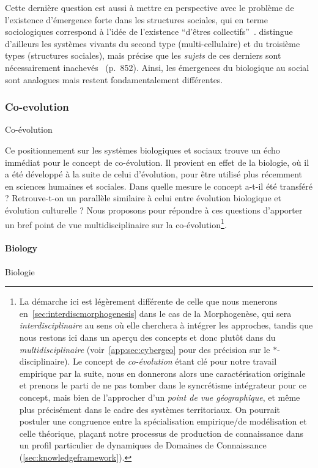 Cette dernière question est aussi à mettre en perspective avec le problème de l'existence d'émergence forte dans les structures sociales, qui en terme sociologiques correspond à l'idée de l'existence ``d'êtres collectifs''~\cite{angeletti2015etres}.  distingue d'ailleurs les systèmes vivants du second type (multi-cellulaire) et du troisième types (structures sociales), mais précise que les \emph{sujets} de ces derniers sont nécessairement inachevés~\cite{morin1980methode} (p.~852). Ainsi, les émergences du biologique au social sont analogues mais restent fondamentalement différentes.



\subsubsection{Co-evolution}{Co-évolution}


Ce positionnement sur les systèmes biologiques et sociaux trouve un écho immédiat pour le concept de co-évolution. Il provient en effet de la biologie, où il a été développé à la suite de celui d'évolution, pour être utilisé plus récemment en sciences humaines et sociales. Dans quelle mesure le concept a-t-il été transféré ? Retrouve-t-on un parallèle similaire à celui entre évolution biologique et évolution culturelle ? Nous proposons pour répondre à ces questions d'apporter un bref point de vue multidisciplinaire sur la co-évolution\footnote{La démarche ici est légèrement différente de celle que nous menerons en~\ref{sec:interdiscmorphogenesis} dans le cas de la Morphogenèse, qui sera \emph{interdisciplinaire} au sens où elle cherchera à intégrer les approches, tandis que nous restons ici dans un aperçu des concepts et donc plutôt dans du \emph{multidisciplinaire} (voir~\ref{app:sec:cybergeo} pour des précision sur le $\ast$-disciplinaire). Le concept de \emph{co-évolution} étant clé pour notre travail empirique par la suite, nous en donnerons alors une caractérisation originale et prenons le parti de ne pas tomber dans le syncrétisme intégrateur pour ce concept, mais bien de l'approcher d'un \emph{point de vue géographique}, et même plus précisément dans le cadre des systèmes territoriaux. On pourrait postuler une congruence entre la spécialisation empirique/de modélisation et celle théorique, plaçant notre processus de production de connaissance dans un profil particulier de dynamiques de Domaines de Connaissance (\ref{sec:knowledgeframework}).}.




\paragraph{Biology}{Biologie}

